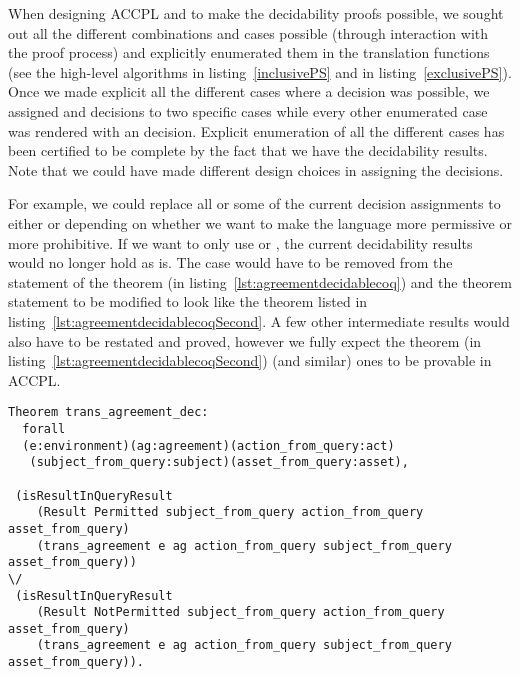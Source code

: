 When designing \ac{ACCPL} and to make the decidability proofs possible, we sought out all the different combinations and cases possible (through interaction with the proof process) and explicitly enumerated them in the translation functions (see the high-level algorithms in listing~\ref{inclusivePS} and in listing~\ref{exclusivePS}). Once we made explicit all the different cases where a decision was possible, we assigned  and  decisions to two specific cases while every other enumerated case was rendered with an  decision. Explicit enumeration of all the different cases has been certified to be complete by the fact that we have the decidability results. Note that we could have made different design choices in assigning the decisions. 

For example, we could replace all or some of the current  decision assignments to either  or  depending on whether we want to make the language more permissive or more prohibitive. If we want to only use  or , the current decidability results would no longer hold as is. The  case would have to be removed from the statement of the theorem  (in listing~\ref{lst:agreementdecidablecoq}) and the theorem statement to be modified to look like the theorem listed in listing~\ref{lst:agreementdecidablecoqSecond}. A few other intermediate results would also have to be restated and proved, however we fully expect the theorem (in listing~\ref{lst:agreementdecidablecoqSecond}) (and similar) ones to be provable in \ac{ACCPL}.

\begin{minipage}[c]{0.95\textwidth}
\begin{lstlisting}
Theorem trans_agreement_dec:
  forall
  (e:environment)(ag:agreement)(action_from_query:act)
   (subject_from_query:subject)(asset_from_query:asset),

 (isResultInQueryResult 
    (Result Permitted subject_from_query action_from_query asset_from_query)
    (trans_agreement e ag action_from_query subject_from_query asset_from_query)) 
\/
 (isResultInQueryResult 
    (Result NotPermitted subject_from_query action_from_query asset_from_query)
    (trans_agreement e ag action_from_query subject_from_query asset_from_query)).

\end{lstlisting}
\end{minipage}

